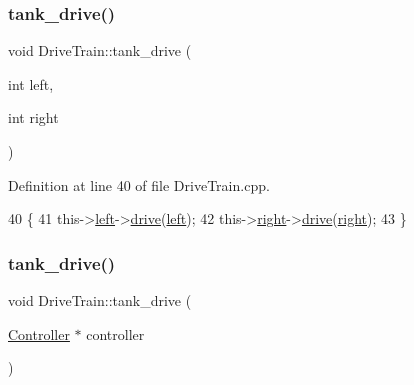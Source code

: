 \subsubsection{\texorpdfstring{tank\+\_\+drive()}{tank\_drive()}\hspace{0.1cm}{\footnotesize\ttfamily [2/4]}}
{\footnotesize\ttfamily void Drive\+Train\+::tank\+\_\+drive (\begin{DoxyParamCaption}\item[{int}]{left,  }\item[{int}]{right }\end{DoxyParamCaption})}



Definition at line 40 of file Drive\+Train.\+cpp.


\begin{DoxyCode}
40                                                \{
41     this->\hyperlink{class_drive_train_a8343c1e4fad9e5c7e68e627f592e52ea}{left}->\hyperlink{class_motor_group_a0c2302784f8226542ded59b6812720ac}{drive}(\hyperlink{class_drive_train_a8343c1e4fad9e5c7e68e627f592e52ea}{left});
42     this->\hyperlink{class_drive_train_a1fe3a54242798b1b88eb437c7c7cf9ad}{right}->\hyperlink{class_motor_group_a0c2302784f8226542ded59b6812720ac}{drive}(\hyperlink{class_drive_train_a1fe3a54242798b1b88eb437c7c7cf9ad}{right});
43 \}
\end{DoxyCode}
\mbox{\label{class_drive_train_aaaa020990153f43209fe1114296cc9d5}} 
\subsubsection{\texorpdfstring{tank\+\_\+drive()}{tank\_drive()}\hspace{0.1cm}{\footnotesize\ttfamily [3/4]}}
{\footnotesize\ttfamily void Drive\+Train\+::tank\+\_\+drive (\begin{DoxyParamCaption}\item[{\hyperlink{class_controller}{Controller} $\ast$}]{controller }\end{DoxyParamCaption})}

\mbox{\label{class_drive_train_a21236fdee1a5a90a41b81ced6548aeb9}} 
